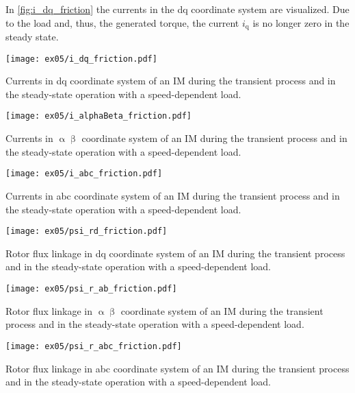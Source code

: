\begin{solutionblock}
    In \autoref{fig:i_dq_friction} the currents in the dq coordinate system are visualized. Due to the load and, thus, the generated torque, the current $i_{\mathrm{q}}$ is no longer zero in the steady state. 
    \begin{solutionfigure}[ht]
        \centering
        \texttt{[image: ex05/i\_dq\_friction.pdf]}
        \caption{Currents in dq coordinate system of an IM during the transient process and in the steady-state operation with a speed-dependent load.}
        \label{fig:i_dq_friction}
    \end{solutionfigure}

    \begin{solutionfigure}[ht]
        \centering
        \texttt{[image: ex05/i\_alphaBeta\_friction.pdf]}
        \caption{Currents in $\upalpha \upbeta$ coordinate system of an IM during the transient process and in the steady-state operation with a speed-dependent load.}
        \label{fig:i_ab_friction}
    \end{solutionfigure}

    \begin{solutionfigure}[ht]
        \centering
        \texttt{[image: ex05/i\_abc\_friction.pdf]}
        \caption{Currents in abc coordinate system of an IM during the transient process and in the steady-state operation with a speed-dependent load.}
        \label{fig:i_abc_friction}
    \end{solutionfigure}

    \begin{solutionfigure}[ht]
        \centering
        \texttt{[image: ex05/psi\_rd\_friction.pdf]}
        \caption{Rotor flux linkage in dq coordinate system of an IM during the transient process and in the steady-state operation with a speed-dependent load.}
        \label{fig:psi_rq_friction}
    \end{solutionfigure}

    \begin{solutionfigure}[ht]
        \centering
        \texttt{[image: ex05/psi\_r\_ab\_friction.pdf]}
        \caption{Rotor flux linkage in $\upalpha\upbeta$ coordinate system of an IM during the transient process and in the steady-state operation with a speed-dependent load.}
        \label{fig:psi_r_ab_friction}
    \end{solutionfigure}

    \begin{solutionfigure}[ht]
        \centering
        \texttt{[image: ex05/psi\_r\_abc\_friction.pdf]}
        \caption{Rotor flux linkage in abc coordinate system of an IM during the transient process and in the steady-state operation with a speed-dependent load.}
        \label{fig:psi_r_abc_friction}
    \end{solutionfigure}



\end{solutionblock}


